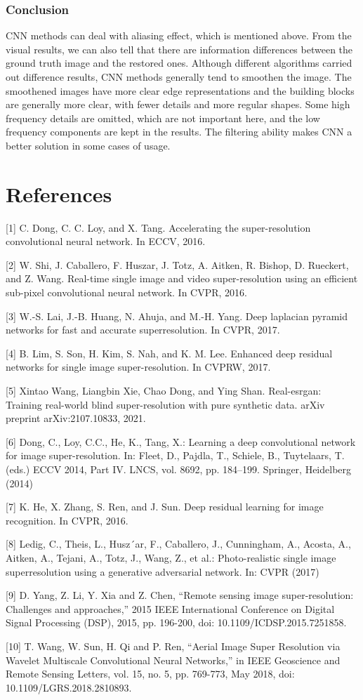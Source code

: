 \documentclass{article}
\begin{document}
  \subsubsection*{Conclusion}
  CNN methods can deal with aliasing effect, which is mentioned above.
  From the visual results, we can also tell that there are information differences between the ground truth image and the restored ones.
  Although different algorithms carried out difference results, CNN methods generally tend to smoothen the image.
  The smoothened images have more clear edge representations and the building blocks are generally more clear, with fewer details and more regular shapes.
  Some high frequency details are omitted, which are not important here, and the low frequency components are kept in the results.
  The filtering ability makes CNN a better solution in some cases of usage.

\section*{References}

[1] C. Dong, C. C. Loy, and X. Tang. Accelerating the super-resolution convolutional neural network. In ECCV, 2016. 

[2] W. Shi, J. Caballero, F. Huszar, J. Totz, A. Aitken, R. Bishop, D. Rueckert, and Z. Wang. Real-time single image and video super-resolution using an efficient sub-pixel convolutional neural network. In CVPR, 2016.

[3] W.-S. Lai, J.-B. Huang, N. Ahuja, and M.-H. Yang. Deep laplacian pyramid networks for fast and accurate superresolution. In CVPR, 2017.

[4] B. Lim, S. Son, H. Kim, S. Nah, and K. M. Lee. Enhanced deep residual networks for single image super-resolution. In CVPRW, 2017.

[5] Xintao Wang, Liangbin Xie, Chao Dong, and Ying Shan. Real-esrgan: Training real-world blind super-resolution with pure synthetic data. arXiv preprint arXiv:2107.10833, 2021.

[6] Dong, C., Loy, C.C., He, K., Tang, X.: Learning a deep convolutional network for image super-resolution. In: Fleet, D., Pajdla, T., Schiele, B., Tuytelaars, T. (eds.) ECCV 2014, Part IV. LNCS, vol. 8692, pp. 184–199. Springer, Heidelberg (2014)

[7] K. He, X. Zhang, S. Ren, and J. Sun. Deep residual learning for image recognition. In CVPR, 2016.

[8] Ledig, C., Theis, L., Husz´ar, F., Caballero, J., Cunningham, A., Acosta, A., Aitken, A., Tejani, A., Totz, J., Wang, Z., et al.: Photo-realistic single image superresolution using a generative adversarial network. In: CVPR (2017)

[9] D. Yang, Z. Li, Y. Xia and Z. Chen, “Remote sensing image super-resolution: Challenges and approaches,” 2015 IEEE International Conference on Digital Signal Processing (DSP), 2015, pp. 196-200, doi: 10.1109/ICDSP.2015.7251858.

[10] T. Wang, W. Sun, H. Qi and P. Ren, “Aerial Image Super Resolution via Wavelet Multiscale Convolutional Neural Networks,” in IEEE Geoscience and Remote Sensing Letters, vol. 15, no. 5, pp. 769-773, May 2018, doi: 10.1109/LGRS.2018.2810893.
\end{document}
